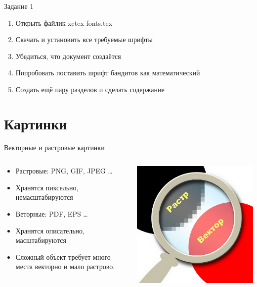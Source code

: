 \documentclass[aspectratio=169]{beamer} %
\begin{document}
\begin{frame}{Задание 1} 
\begin{enumerate}
	\item  Открыть файлик  xetex fonts.tex 
	\item  Скачать и установить все требуемые шрифты
	\item  Убедиться, что документ создаётся
	\item  Попробовать поставить шрифт бандитов как математический  
	\item  Создать ещё пару разделов и сделать содержание
\end{enumerate}
\end{frame}


 
\section{Картинки} 

\begin{frame}{Векторные и растровые картинки} 
\begin{columns}
\begin{column}{.55\linewidth}
\begin{itemize}
\item Растровые: PNG, GIF, JPEG \ldots
\item Хранятся пиксельно, немасштабируются
\item Веторные: PDF, EPS \ldots
\item Хранятся описательно, масштабируются
\item Сложный объект требует много места векторно и мало растрово.
\end{itemize}
\end{column}
\begin{column}{.42\linewidth}
\includegraphics[width=0.99\linewidth]{rv.jpg}
\end{column}
\end{columns}
\end{frame}
\end{document}
